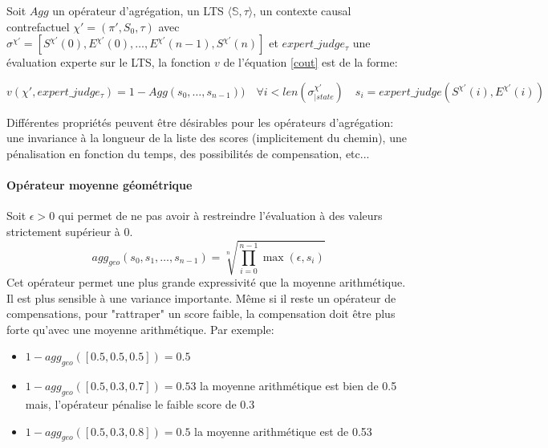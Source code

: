 \documentclass[11pt]{extarticle}
\begin{document}
Soit $Agg$ un opérateur d'agrégation, un LTS $\langle \mathds{S},\tau \rangle$, un contexte causal contrefactuel $\chi'= (\pi',S_0,\tau)$ avec $\sigma^{\chi'}= [S^{\chi'}(0),E^{\chi'}(0),\dots,E^{\chi'}(n-1),S^{\chi'}(n)]$ et $expert\_judge_\tau$ une évaluation experte sur le LTS, la fonction $v$ de l'équation \ref{cout} est de la forme:

\begin{equation}
    v(\chi',expert\_judge_\tau)= 1 - Agg(s_0, \dots, s_{n-1})) \quad \forall i < len(\sigma^{\chi'}_{|state}) \quad s_i= expert\_judge(S^{\chi'}(i),E^{\chi'}(i))
\end{equation}\label{exploit_direct}



Différentes propriétés peuvent être désirables pour les opérateurs d'agrégation: une invariance à la longueur de la liste des scores (implicitement du chemin), une pénalisation en fonction du temps, des possibilités de compensation, etc...


 \paragraph{Opérateur moyenne géométrique} 
 Soit $\epsilon>0$ qui permet de ne pas avoir à restreindre l'évaluation à des valeurs strictement supérieur à 0.
    \begin{equation}
            agg_{geo}(s_0,s_1,\dots,s_{n-1}) =\sqrt[n]{\prod_{i=0}^{n-1} \max (\epsilon,s_i)} 
    \end{equation}
    Cet opérateur permet une plus grande expressivité que la moyenne arithmétique. Il est plus sensible à une variance importante. Même si il reste un opérateur de compensations, pour "rattraper" un score faible, la compensation doit être plus forte qu'avec une moyenne arithmétique. Par exemple:
    \begin{itemize}
        \item $1 - agg_{geo}([0.5,0.5,0.5]) = 0.5$
        \item$ 1 - agg_{geo}([0.5,0.3,0.7]) = 0.53$ la moyenne arithmétique est bien de 0.5 mais, l'opérateur pénalise le faible score de 0.3
        \item $1 - agg_{geo}([0.5,0.3,0.8]) = 0.5$ la moyenne arithmétique est de 0.53
        
    \end{itemize}
\end{document}
